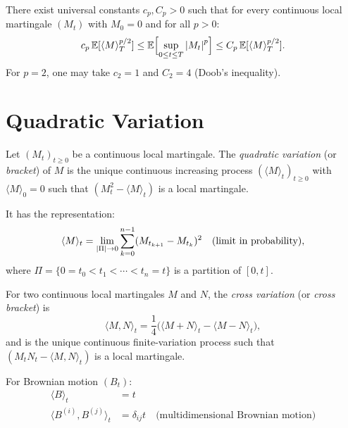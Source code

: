 \begin{theorem}
\label{thm:BDG}
There exist universal constants $c_p, C_p > 0$ such that for every continuous
local martingale $(M_t)$ with $M_0 = 0$ and for all $p > 0$:
\[
  c_p \, \mathbb{E}[\langle M \rangle_T^{p/2}]
  \leq \mathbb{E}\Bigl[\sup_{0 \leq t \leq T} \left| M_t \right|^p\Bigr]
  \leq C_p \, \mathbb{E}[\langle M \rangle_T^{p/2}].
\]
For $p = 2$, one may take $c_2 = 1$ and $C_2 = 4$ (Doob's inequality).
\end{theorem}

\section{Quadratic Variation}

\begin{definition}
\label{def:quadratic_variation}
Let $(M_t)_{t \geq 0}$ be a continuous local martingale. The \emph{quadratic
variation} (or \emph{bracket}) of $M$ is the unique continuous increasing
process $(\langle M \rangle_t)_{t \geq 0}$ with $\langle M \rangle_0 = 0$ such
that $(M_t^2 - \langle M \rangle_t)$ is a local martingale.

It has the representation:
\[
  \langle M \rangle_t = \lim_{\left| \Pi \right| \to 0}
  \sum_{k=0}^{n-1} (M_{t_{k+1}} - M_{t_k})^2 \quad \text{(limit in probability)},
\]
where $\Pi = \{0 = t_0 < t_1 < \cdots < t_n = t\}$ is a partition of $[0, t]$.
\end{definition}

\begin{definition}
For two continuous local martingales $M$ and $N$, the \emph{cross variation}
(or \emph{cross bracket}) is
\[
  \langle M, N \rangle_t = \frac{1}{4}\bigl(\langle M + N \rangle_t
  - \langle M - N \rangle_t\bigr),
\]
and is the unique continuous finite-variation process such that
$(M_t N_t - \langle M, N \rangle_t)$ is a local martingale.
\end{definition}

\begin{keyformulas}[title=\textbf{Fundamental Quadratic Variations}]
For Brownian motion $(B_t)$:
\begin{align*}
  \langle B \rangle_t &= t \\
  \langle B^{(i)}, B^{(j)} \rangle_t &= \delta_{ij} t
    \quad \text{(multidimensional Brownian motion)}
\end{align*}
\end{keyformulas}

